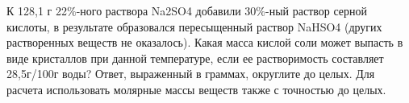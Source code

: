 
К 128,1 г 22$\%$-ного раствора Na2SO4 добавили 30$\%$-ный
раствор серной кислоты, в результате образовался пересыщенный раствор NaHSO4 (других
растворенных веществ не оказалось). Какая масса кислой соли может выпасть в
виде кристаллов при данной температуре, если ее растворимость составляет
28,5г/100г воды? Ответ, выраженный в граммах, округлите до целых. Для расчета
использовать молярные массы веществ также с точностью до целых.



